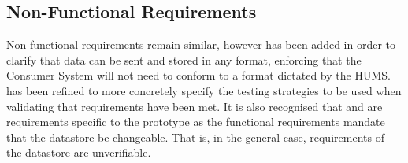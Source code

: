\subsection{Non-Functional Requirements}
Non-functional requirements remain similar, however  has been 
added in order to clarify that data can be sent and stored in any format, 
enforcing that the Consumer System will not need to conform to a format
dictated by the HUMS.  has been refined to more concretely specify the
testing strategies to be used when validating that requirements have been met.
It is also recognised that  and  are requirements 
specific to the prototype as the functional requirements mandate that the 
datastore be changeable. That is, in the general case, requirements 
of the datastore are unverifiable.

